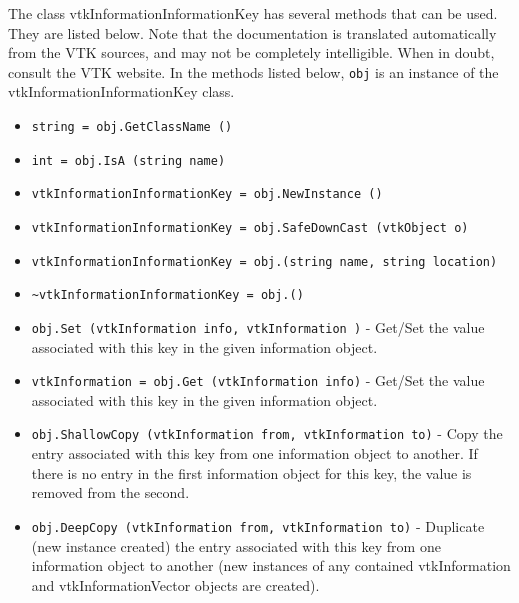 The class vtkInformationInformationKey has several methods that can be used.
  They are listed below.
Note that the documentation is translated automatically from the VTK sources,
and may not be completely intelligible.  When in doubt, consult the VTK website.
In the methods listed below, \verb|obj| is an instance of the vtkInformationInformationKey class.
\begin{itemize}
\item  \verb|string = obj.GetClassName ()|

\item  \verb|int = obj.IsA (string name)|

\item  \verb|vtkInformationInformationKey = obj.NewInstance ()|

\item  \verb|vtkInformationInformationKey = obj.SafeDownCast (vtkObject o)|

\item  \verb|vtkInformationInformationKey = obj.(string name, string location)|

\item  \verb|~vtkInformationInformationKey = obj.()|

\item  \verb|obj.Set (vtkInformation info, vtkInformation )| -  Get/Set the value associated with this key in the given
 information object.

\item  \verb|vtkInformation = obj.Get (vtkInformation info)| -  Get/Set the value associated with this key in the given
 information object.

\item  \verb|obj.ShallowCopy (vtkInformation from, vtkInformation to)| -  Copy the entry associated with this key from one information
 object to another.  If there is no entry in the first information
 object for this key, the value is removed from the second.

\item  \verb|obj.DeepCopy (vtkInformation from, vtkInformation to)| -  Duplicate (new instance created) the entry associated with this key from
 one information object to another (new instances of any contained
 vtkInformation and vtkInformationVector objects are created).  

\end{itemize}
